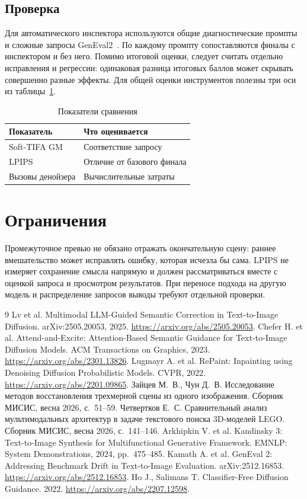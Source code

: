 \documentclass{misisarticle}
\begin{document}
\subsection{Проверка}
Для автоматического инспектора используются общие диагностические промпты и сложные запросы GenEval2~\cite{geneval2}. По каждому промпту сопоставляются финалы с инспектором и без него. Помимо итоговой оценки, следует считать отдельно исправления и регрессии: одинаковая разница итоговых баллов может скрывать совершенно разные эффекты. Для общей оценки инструментов полезны три оси из таблицы~\ref{tab:metrics}.

\begin{table}[htbp]
\caption{Показатели сравнения}
\label{tab:metrics}
\centering
\begin{tabular}{@{}ll@{}}
\toprule
Показатель & Что оценивается \\
\midrule
Soft-TIFA GM & Соответствие запросу \\
LPIPS & Отличие от базового финала \\
Вызовы денойзера & Вычислительные затраты \\
\bottomrule
\end{tabular}
\end{table}

\section{Ограничения}
Промежуточное превью не обязано отражать окончательную сцену: раннее вмешательство может исправлять ошибку, которая исчезла бы сама. LPIPS не измеряет сохранение смысла напрямую и должен рассматриваться вместе с оценкой запроса и просмотром результатов. При переносе подхода на другую модель и распределение запросов выводы требуют отдельной проверки.

\begin{thebibliography}{9}
 Lv et al. Multimodal LLM-Guided Semantic Correction in Text-to-Image Diffusion. arXiv:2505.20053, 2025. \url{https://arxiv.org/abs/2505.20053}.
 Chefer H. et al. Attend-and-Excite: Attention-Based Semantic Guidance for Text-to-Image Diffusion Models. ACM Transactions on Graphics, 2023. \url{https://arxiv.org/abs/2301.13826}.
 Lugmayr A. et al. RePaint: Inpainting using Denoising Diffusion Probabilistic Models. CVPR, 2022. \url{https://arxiv.org/abs/2201.09865}.
 Зайцев М.~В., Чун Д.~В. Исследование методов восстановления трехмерной сцены из одного изображения. Сборник МИСИС, весна 2026, с.~51--59.
 Четвертков Е.~С. Сравнительный анализ мультимодальных архитектур в задаче текстового поиска 3D-моделей LEGO. Сборник МИСИС, весна 2026, с.~141--146.
 Arkhipkin V. et al. Kandinsky 3: Text-to-Image Synthesis for Multifunctional Generative Framework. EMNLP: System Demonstrations, 2024, pp.~475--485.
 Kamath A. et al. GenEval 2: Addressing Benchmark Drift in Text-to-Image Evaluation. arXiv:2512.16853. \url{https://arxiv.org/abs/2512.16853}.
 Ho J., Salimans T. Classifier-Free Diffusion Guidance. 2022. \url{https://arxiv.org/abs/2207.12598}.
\end{thebibliography}
\end{document}

